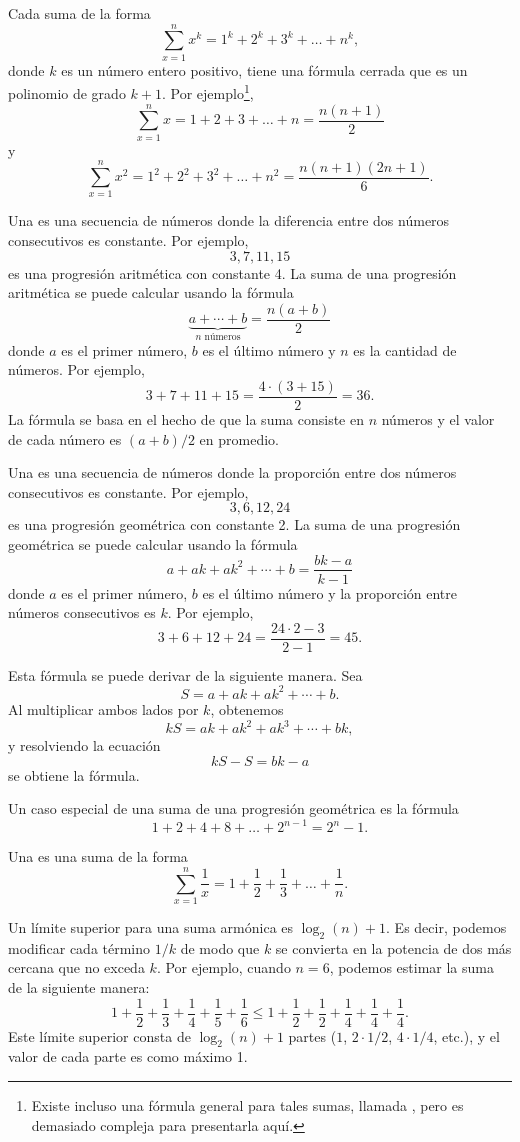 Cada suma de la forma
\[\sum_{x=1}^n x^k = 1^k+2^k+3^k+\ldots+n^k,\]
donde $k$ es un número entero positivo,
tiene una fórmula cerrada que es un
polinomio de grado $k+1$.
Por ejemplo\footnote{
Existe incluso una fórmula general para tales sumas, llamada ,
pero es demasiado compleja para presentarla aquí.},
\[\sum_{x=1}^n x = 1+2+3+\ldots+n = \frac{n(n+1)}{2}\]
y
\[\sum_{x=1}^n x^2 = 1^2+2^2+3^2+\ldots+n^2 = \frac{n(n+1)(2n+1)}{6}.\]

Una  es una 
secuencia de números
donde la diferencia entre dos números consecutivos
es constante.
Por ejemplo,
\[3, 7, 11, 15\]
es una progresión aritmética con constante 4.
La suma de una progresión aritmética se puede calcular
usando la fórmula
\[\underbrace{a + \cdots + b}_{n \,\, \textrm{números}} = \frac{n(a+b)}{2}\]
donde $a$ es el primer número,
$b$ es el último número y
$n$ es la cantidad de números.
Por ejemplo,
\[3+7+11+15=\frac{4 \cdot (3+15)}{2} = 36.\]
La fórmula se basa en el hecho
de que la suma consiste en $n$ números y
el valor de cada número es $(a+b)/2$ en promedio.

Una  es una secuencia
de números
donde la proporción entre dos números consecutivos
es constante.
Por ejemplo,
\[3,6,12,24\]
es una progresión geométrica con constante 2.
La suma de una progresión geométrica se puede calcular
usando la fórmula
\[a + ak + ak^2 + \cdots + b = \frac{bk-a}{k-1}\]
donde $a$ es el primer número,
$b$ es el último número y la
proporción entre números consecutivos es $k$.
Por ejemplo,
\[3+6+12+24=\frac{24 \cdot 2 - 3}{2-1} = 45.\]


Esta fórmula se puede derivar de la siguiente manera. Sea
\[ S = a + ak + ak^2 + \cdots + b .\]
Al multiplicar ambos lados por $k$, obtenemos
\[ kS = ak + ak^2 + ak^3 + \cdots + bk,\]
y resolviendo la ecuación
\[ kS-S = bk-a\]
se obtiene la fórmula.

Un caso especial de una suma de una progresión geométrica es la fórmula
\[1+2+4+8+\ldots+2^{n-1}=2^n-1.\]


Una  es una suma de la forma
\[ \sum_{x=1}^n \frac{1}{x} = 1+\frac{1}{2}+\frac{1}{3}+\ldots+\frac{1}{n}.\]

Un límite superior para una suma armónica es $\log_2(n)+1$.
Es decir, podemos
modificar cada término $1/k$ de modo que $k$ se convierta
en la potencia de dos más cercana que no exceda $k$.
Por ejemplo, cuando $n=6$, podemos estimar
la suma de la siguiente manera:
\[ 1+\frac{1}{2}+\frac{1}{3}+\frac{1}{4}+\frac{1}{5}+\frac{1}{6} \le
1+\frac{1}{2}+\frac{1}{2}+\frac{1}{4}+\frac{1}{4}+\frac{1}{4}.\]
Este límite superior consta de $\log_2(n)+1$ partes
($1$, $2 \cdot 1/2$, $4 \cdot 1/4$, etc.),
y el valor de cada parte es como máximo 1.

